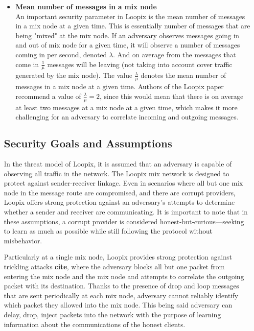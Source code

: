 \documentclass[a4paper,11pt,oneside]{report}
\begin{document}
\begin{itemize}
\item \textbf{Mean number of messages in a mix node} \\
\label{item:lambda_over_mu}
An important security parameter in Loopix is the mean number of messages in a mix node at a given time. This is essentially number of messages that are being "mixed" at the mix node. If an adversary observes messages going in and out of mix node for a given time, it will observe a number of messages coming in per second, denoted \(\lambda\). And on average from the messages that come in \(\frac{1}{\mu}\) messages will be leaving (not taking into account cover traffic generated by the mix node). The value \(\frac{\lambda}{\mu}\) denotes the mean number of messages in a mix node at a given time. Authors of the Loopix paper recommend a value of \(\frac{\lambda}{\mu} = 2\), since this would mean that there is on average at least two messages at a mix node at a given time, which makes it more challenging for an adversary to correlate incoming and outgoing messages.
\end{itemize}

\subsection{Security Goals and Assumptions}
\label{sec:loopix_assumptions}
In the threat model of Loopix, it is assumed that an adversary is capable of observing all traffic in the network. The Loopix mix network is designed to protect against sender-receiver linkage. Even in scenarios where all but one mix node in the message route are compromised, and there are corrupt providers, Loopix offers strong protection against an adversary's attempts to determine whether a sender and receiver are communicating. It is important to note that in these assumptions, a corrupt provider is considered honest-but-curious—seeking to learn as much as possible while still following the protocol without misbehavior.

Particularly at a single mix node, Loopix provides strong protection against trickling attacks \textbf{cite}, where the adversary blocks all but one packet from entering the mix node and the mix node and attempts to correlate the outgoing packet with its destination. Thanks to the presence of drop and loop messages that are sent periodically at each mix node, adversary cannot reliably identify which packet they allowed into the mix node. This being said adversary can delay, drop, inject packets into the network with the purpose of learning information about the communications of the honest clients.
\end{document}
